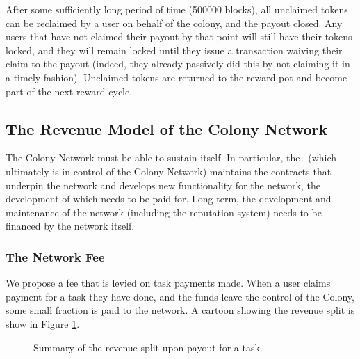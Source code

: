 After some sufficiently long period of time (500000 blocks), all unclaimed tokens can be reclaimed by a user on behalf of the colony, and the payout closed. Any users that have not claimed their payout by that point will still have their tokens locked, and they will remain locked until they issue a transaction waiving their claim to the payout (indeed, they already passively did this by not claiming it in a timely fashion). Unclaimed tokens are returned to the reward pot and become part of the next reward cycle.

\subsection{The Revenue Model of the Colony Network}\label{sec:networkrevenue}
The Colony Network must be able to sustain itself. In particular, the \rc\ (which ultimately is in control of the Colony Network) maintains the contracts that underpin the network and develops new functionality for the network, the development of which needs to be paid for. Long term, the development and maintenance of the network (including the reputation system) needs to be financed by the network itself. 

\subsubsection{The Network Fee}\label{sec:networkfee}
We propose a fee that is levied on task payments made. When a user claims payment for a task they have done, and the funds leave the control of the Colony, some small fraction is paid to the network. A cartoon showing the revenue split is show in Figure \ref{fig:revenueSplit}. 

\begin{figure}[htp]
\centering
 \caption{Summary of the revenue split upon payout for a task.}
 \label{fig:revenueSplit}

\end{figure}


